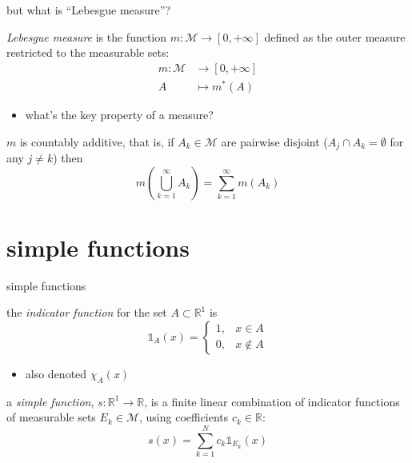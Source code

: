 \documentclass[10pt,
               svgnames,
               hyperref={colorlinks,
                         citecolor=DeepPink4,
                         linkcolor=FireBrick,
                         urlcolor=blue},
               usepdftitle=false]{beamer}
\newcommand{\cM}{\mathcal{M}}
\newcommand{\RR}{\mathbb{R}}
\newcommand{\one}{\mathds{1}}
\begin{document}
\begin{frame}{but what is ``Lebesgue measure''?}

\begin{definition}
\emph{Lebesgue measure} is the function $m:\cM \to [0,+\infty]$ defined as the outer measure restricted to the measurable sets:
\begin{align*}
m : \cM &\to [0,+\infty] \\
    A &\mapsto m^*(A)
\end{align*}
\end{definition}

\begin{itemize}
\item what's the key property of a measure?
\end{itemize}

\begin{lemma}
$m$ is \alert{countably additive}, that is, if $A_k\in \cM$ are pairwise disjoint ($A_j \cap A_k = \emptyset$ for any $j\ne k$) then
	$$m\left(\bigcup_{k=1}^\infty A_k\right) = \sum_{k=1}^\infty m(A_k)$$
\end{lemma}
\end{frame}


\AtBeginSection[] {
    \begin{frame}{Outline}
    \setbeamertemplate{section in toc}[sections numbered]
    \tableofcontents[currentsection]%
    \end{frame}
}

\section{simple functions}

\begin{frame}{simple functions}

\begin{definition}
the \emph{indicator function} for the set $A\subset \RR^1$ is
	$$\one_A(x) = \begin{cases} 1, & x\in A \\ 0, & x\notin A \end{cases}$$
\end{definition}

\begin{itemize}
\item also denoted $\chi_A(x)$
\end{itemize}

\begin{definition}
a \emph{simple function}, $s:\RR^1\to\RR$, is a \alert{finite linear combination of indicator functions of measurable sets} $E_k \in \cM$, using coefficients $c_k\in\RR$:
	$$s(x) = \sum_{k=1}^N c_k \one_{E_k}(x)$$
\end{definition}
\end{frame}
\end{document}
